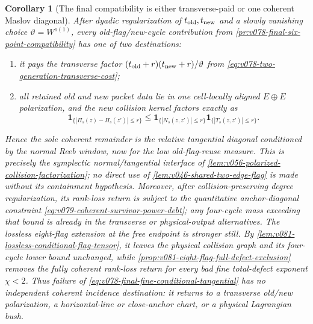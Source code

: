 \documentclass[10pt]{article}
\newtheorem{corollary}[theorem]{Corollary}
\begin{document}
\begin{corollary}[The final compatibility is either transverse-paid or one coherent Maslov diagonal]
\label{cor:v078-final-two-generation-routing}
After dyadic regularization of \(t_{\rm old},t_{\rm new}\) and a slowly vanishing choice
\(\vartheta=W^{o(1)}\), every old-flag/new-cycle contribution from
\cref{pr:v078-final-six-point-compatibility} has one of two destinations:
\begin{enumerate}[label=\textnormal{(\roman*)}]
\item it pays the transverse factor
\((t_{\rm old}+r)(t_{\rm new}+r)/\vartheta\) from
\eqref{eq:v078-two-generation-transverse-cost};
\item all retained old and new packet data lie in one cell-locally aligned
\(E\oplus E\) polarization, and the new collision kernel factors exactly as
\begin{equation}
\label{eq:v078-final-coherent-normal-tangential-factorization}
\boxed{
\mathbf 1_{\{|\Pi_s(z)-\Pi_s(z')|\le r\}}
\le
\mathbf 1_{\{|N_s(z,z')|\le r\}}
\mathbf 1_{\{|T_s(z,z')|\le r\}}.
}
\end{equation}
\end{enumerate}
Hence the sole coherent remainder is the relative tangential diagonal conditioned by the normal
Reeb window, now for the low old-flag-reuse measure.  This is precisely the symplectic
normal/tangential interface of \cref{lem:v056-polarized-collision-factorization}; no direct use of
\cref{lem:v046-shared-two-edge-flag} is made without its containment hypothesis.
Moreover, after collision-preserving degree regularization, its rank-loss return is subject to the
quantitative anchor-diagonal constraint
\eqref{eq:v079-coherent-survivor-power-debt}; any four-cycle mass exceeding that bound is already
in the transverse or physical-output alternatives.
The lossless eight-flag extension at the free endpoint is stronger still.  By
\cref{lem:v081-lossless-conditional-flag-tensor}, it leaves the physical collision graph and its
four-cycle lower bound unchanged, while
\cref{prop:v081-eight-flag-full-defect-exclusion} removes the fully coherent rank-loss return for
every bad fine total-defect exponent \(\chi<2\).  Thus failure of
\eqref{eq:v078-final-fine-conditional-tangential} has no independent coherent incidence
destination: it returns to a transverse old/new polarization, a horizontal-line or close-anchor
chart, or a physical Lagrangian bush.
\end{corollary}
\end{document}
